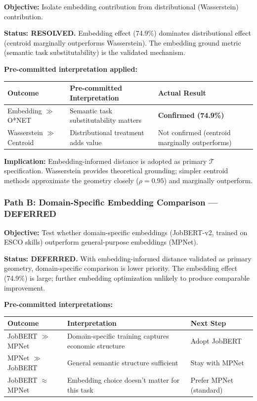 \documentclass[12pt]{article}
\begin{document}
\textbf{Objective:} Isolate embedding contribution from distributional (Wasserstein) contribution.

\textbf{Status: RESOLVED.} Embedding effect (74.9\%) dominates distributional effect (centroid marginally outperforms Wasserstein). The embedding ground metric (semantic task substitutability) is the validated mechanism.

\textbf{Pre-committed interpretation applied:}
\begin{table}[h!]
\centering
\begin{tabular}{lll}
\toprule
\textbf{Outcome} & \textbf{Pre-committed Interpretation} & \textbf{Actual Result} \\
\midrule
Embedding $\gg$ O*NET & Semantic task substitutability matters & \textbf{Confirmed (74.9\%)} \\
Wasserstein $\gg$ Centroid & Distributional treatment adds value & Not confirmed (centroid marginally outperforms) \\
\bottomrule
\end{tabular}
\end{table}

\textbf{Implication:} Embedding-informed distance is adopted as primary $\mathcal{T}$ specification. Wasserstein provides theoretical grounding; simpler centroid methods approximate the geometry closely ($\rho = 0.95$) and marginally outperform.


\subsubsection{Path B: Domain-Specific Embedding Comparison --- DEFERRED}


\textbf{Objective:} Test whether domain-specific embeddings (JobBERT-v2, trained on ESCO skills) outperform general-purpose embeddings (MPNet).

\textbf{Status: DEFERRED.} With embedding-informed distance validated as primary geometry, domain-specific comparison is lower priority. The embedding effect (74.9\%) is large; further embedding optimization unlikely to produce comparable improvement.

\textbf{Pre-committed interpretations:}
\begin{table}[h!]
\centering
\begin{tabular}{lll}
\toprule
\textbf{Outcome} & \textbf{Interpretation} & \textbf{Next Step} \\
\midrule
JobBERT $\gg$ MPNet & Domain-specific training captures economic structure & Adopt JobBERT \\
MPNet $\gg$ JobBERT & General semantic structure sufficient & Stay with MPNet \\
JobBERT $\approx$ MPNet & Embedding choice doesn't matter for this task & Prefer MPNet (standard) \\
\bottomrule
\end{tabular}
\end{table}
\end{document}

